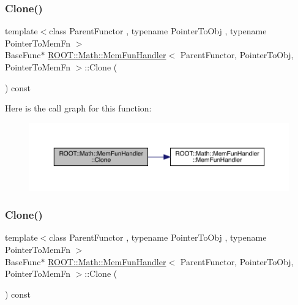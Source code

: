 \subsubsection{\texorpdfstring{Clone()}{Clone()}\hspace{0.1cm}{\footnotesize\ttfamily [2/3]}}
{\footnotesize\ttfamily template$<$class Parent\+Functor , typename Pointer\+To\+Obj , typename Pointer\+To\+Mem\+Fn $>$ \\
Base\+Func$\ast$ \mbox{\hyperlink{classROOT_1_1Math_1_1MemFunHandler}{R\+O\+O\+T\+::\+Math\+::\+Mem\+Fun\+Handler}}$<$ Parent\+Functor, Pointer\+To\+Obj, Pointer\+To\+Mem\+Fn $>$\+::Clone (\begin{DoxyParamCaption}{ }\end{DoxyParamCaption}) const\hspace{0.3cm}{\ttfamily [inline]}}

Here is the call graph for this function\+:
\nopagebreak
\begin{figure}[H]
\begin{center}
\leavevmode
\includegraphics[width=350pt]{d6/d5f/classROOT_1_1Math_1_1MemFunHandler_a71089a87a2f1ca482d176caca602f16c_cgraph}
\end{center}
\end{figure}
\mbox{\label{classROOT_1_1Math_1_1MemFunHandler_a71089a87a2f1ca482d176caca602f16c}} 
\subsubsection{\texorpdfstring{Clone()}{Clone()}\hspace{0.1cm}{\footnotesize\ttfamily [3/3]}}
{\footnotesize\ttfamily template$<$class Parent\+Functor , typename Pointer\+To\+Obj , typename Pointer\+To\+Mem\+Fn $>$ \\
Base\+Func$\ast$ \mbox{\hyperlink{classROOT_1_1Math_1_1MemFunHandler}{R\+O\+O\+T\+::\+Math\+::\+Mem\+Fun\+Handler}}$<$ Parent\+Functor, Pointer\+To\+Obj, Pointer\+To\+Mem\+Fn $>$\+::Clone (\begin{DoxyParamCaption}{ }\end{DoxyParamCaption}) const\hspace{0.3cm}{\ttfamily [inline]}}

